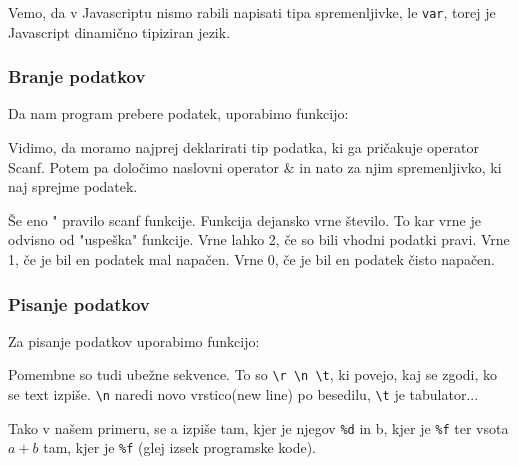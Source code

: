\documentclass[a4paper, 12pt]{article}
\begin{document}
Vemo, da v Javascriptu nismo rabili napisati tipa spremenljivke, le \texttt{var}, torej je Javascript dinamično tipiziran jezik.

\subsubsection{Branje podatkov}
Da nam program prebere podatek, uporabimo funkcijo:

\begin{center}
\end{center}

Vidimo, da moramo najprej deklarirati tip podatka, ki ga pričakuje operator Scanf. Potem pa določimo naslovni operator \& in nato za njim spremenljivko, ki naj sprejme podatek.

Še eno " pravilo scanf funkcije. Funkcija dejansko vrne število. To kar vrne je odvisno od "uspeška" funkcije. Vrne lahko 2, če so bili vhodni podatki pravi. Vrne 1, če je bil en podatek mal napačen. Vrne 0, če je bil en podatek čisto napačen.

\subsubsection{Pisanje podatkov}
Za pisanje podatkov uporabimo funkcijo:
\begin{center}
\end{center}
Pomembne so tudi ubežne sekvence. To so \verb|\r \n \t|, ki povejo, kaj se zgodi, ko se text izpiše. \verb|\n| naredi novo vrstico(new line) po besedilu, \verb|\t| je tabulator...

Tako v našem primeru, se a izpiše tam, kjer je njegov \verb|%d| in b, kjer je \verb|%f| ter vsota $a + b$ tam, kjer je \verb|%f| (glej izsek programske kode).
\end{document}
